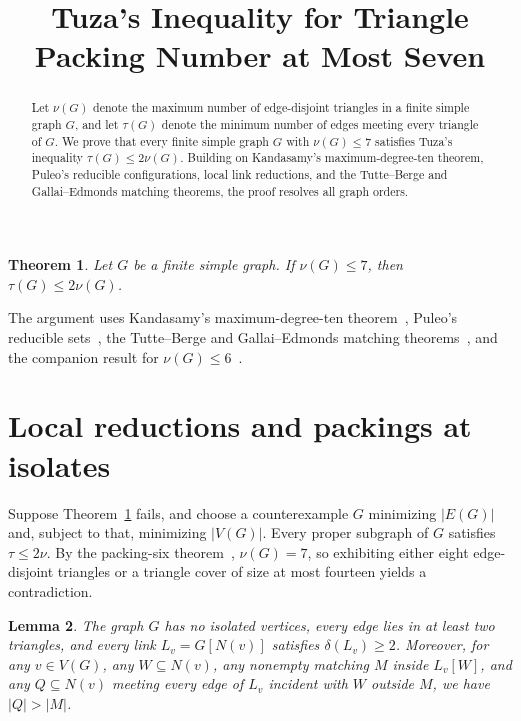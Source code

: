 \documentclass[11pt]{article}
\title{Tuza's Inequality for Triangle Packing Number at Most Seven}
\author{}
\date{}
\newtheorem{theorem}{Theorem}
\newtheorem{lemma}[theorem]{Lemma}
\begin{document}
\maketitle

\begin{abstract}
Let $\nu(G)$ denote the maximum number of edge-disjoint triangles in a finite simple graph $G$, and let $\tau(G)$ denote the minimum number of edges meeting every triangle of $G$. We prove that every finite simple graph $G$ with $\nu(G)\leq 7$ satisfies Tuza's inequality $\tau(G)\leq 2\nu(G)$. Building on Kandasamy's maximum-degree-ten theorem, Puleo's reducible configurations, local link reductions, and the Tutte--Berge and Gallai--Edmonds matching theorems, the proof resolves all graph orders.
\end{abstract}

\begin{theorem}\label{thm:main}
Let $G$ be a finite simple graph. If $\nu(G)\leq 7$, then $\tau(G)\leq 2\nu(G)$.
\end{theorem}

The argument uses Kandasamy's maximum-degree-ten theorem~\cite{Kandasamy}, Puleo's reducible sets~\cite{Puleo}, the Tutte--Berge and Gallai--Edmonds matching theorems~\cite{Schrijver}, and the companion result for $\nu(G)\leq 6$~\cite{PackingSix}.

\section{Local reductions and packings at isolates}

Suppose Theorem~\ref{thm:main} fails, and choose a counterexample $G$ minimizing $|E(G)|$ and, subject to that, minimizing $|V(G)|$. Every proper subgraph of $G$ satisfies $\tau\leq 2\nu$. By the packing-six theorem~\cite{PackingSix}, $\nu(G)=7$, so exhibiting either eight edge-disjoint triangles or a triangle cover of size at most fourteen yields a contradiction.

\begin{lemma}\label{lem:basic}
The graph $G$ has no isolated vertices, every edge lies in at least two triangles, and every link $L_v=G[N(v)]$ satisfies $\delta(L_v)\geq 2$. Moreover, for any $v\in V(G)$, any $W\subseteq N(v)$, any nonempty matching $M$ inside $L_v[W]$, and any $Q\subseteq N(v)$ meeting every edge of $L_v$ incident with $W$ outside $M$, we have $|Q|>|M|$.
\end{lemma}
\end{document}
